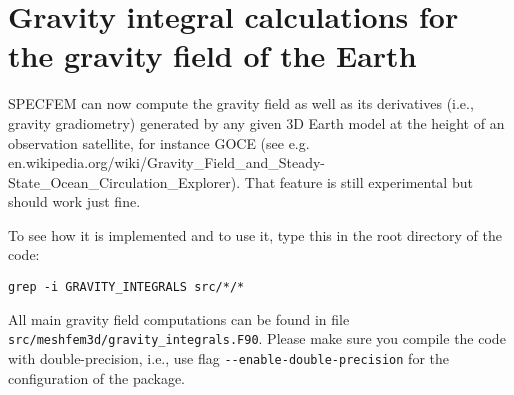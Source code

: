 \chapter{Gravity integral calculations for the gravity field of the Earth}


SPECFEM can now compute the gravity field as well as its derivatives (i.e., gravity gradiometry)
generated by any given 3D Earth model at the height
of an observation satellite, for instance GOCE\newline
(see e.g. en.wikipedia.org/wiki/Gravity\_Field\_and\_Steady-State\_Ocean\_Circulation\_Explorer).\newline
That feature is still experimental but should work just fine.\newline


\noindent
To see how it is implemented and to use it, type this in the root directory of the code:
\begin{verbatim}
grep -i GRAVITY_INTEGRALS src/*/*
\end{verbatim}
All main gravity field computations can be found in file \texttt{src/meshfem3d/gravity\_integrals.F90}.
Please make sure you compile the code with double-precision, i.e., use flag \texttt{{-}{-}enable-double-precision} for the
configuration of the package.
